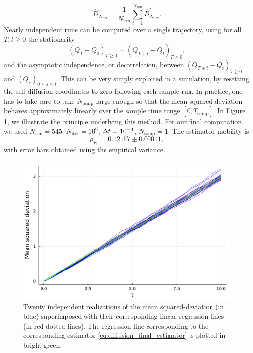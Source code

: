     \begin{equation}
        \label{eq:diffusion_final_estimator}
        \widehat{D}_{N_{\mathrm{iter}}}=\frac{1}{N_{\mathrm{run}}}\sum_{i=1}^{N_{\mathrm{run}}}\widehat{D}^i_{N_{\mathrm{iter}}}.
    \end{equation}
    Nearly independent runs can be computed over a single trajectory, using for all $T,t\geq 0$ the stationarity
    \[(Q_T-Q_0)_{T\geq 0} \sim (Q_{T+t}-Q_t)_{T\geq 0},\]
    and the asymptotic independence, or decorrelation, between $(Q_{T+t}-Q_t)_{T\geq 0}$ and $(Q_s)_{0\leq s\leq t}$.
    This can be very simply exploited in a simulation, by resetting the self-diffusion coordinates to zero following each sample run. 
    In practice, one has to take care to take $N_{\mathrm{samp}}$ large enough so that the mean-squared deviation behaves approximately linearly over the sample time range $[0,T_{\mathrm{samp}}]$.
    In Figure \ref{fig:einstein_demo}, we illustrate the principle underlying this method. 
    For our final computation, we used $N_{\mathrm{run}}=545$, $N_{\mathrm{iter}}=10^6$, ${\Delta t}=10^{-3}$, $N_{\mathrm{samp}}=1$.
    The estimated mobility is 
    \begin{equation}
        \label{eq:einstein_est_mobility}
        \rho_{F_{\mathrm{S}}}=0.12157\pm 0.00011,
    \end{equation}
    with error bars obtained using the empirical variance.
\begin{figure}[htbp]
    \begin{center}
      \includegraphics[width=0.8\linewidth]{figures/einstein_demo.pdf}
      \caption{ \label{fig:einstein_demo}
        Twenty independent realizations of the mean squared-deviation (in blue) superimposed with their corresponding linear regression lines (in red dotted lines).
        The regression line corresponding to the corresponding estimator \eqref{eq:diffusion_final_estimator} is plotted in bright green.
      }
    \end{center}
  \end{figure}
